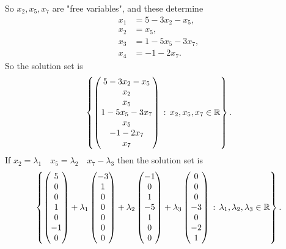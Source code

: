 \documentclass[10pt, a4paper]{article}
\begin{document}
\begin{example}
    So $x_2, x_5, x_7$ are "free variables",
    and these determine
    \begin{align*}
    x_1 &= 5 - 3x_2 - x_5, \\
    x_2 &= x_5, \\
    x_3 &= 1 - 5x_5 - 3x_7, \\
    x_4 &= -1 - 2x_7.
    \end{align*}
    So the solution set is
    \[
    \left\{
    \begin{pmatrix}
        5 - 3x_2 - x_5 \\
        x_2 \\
        x_5 \\
        1 - 5x_5 - 3x_7 \\
        x_5 \\
        -1 -2x_7 \\
        x_7
    \end{pmatrix}
    \,:\,
    x_2, x_5, x_7 \in \mathbb{R}
    \right\}.
    \]
    If $x_2 = \lambda_1\quad x_5 = \lambda_2\quad x_7 - \lambda_3$
    then the solution set is
    \[
    \left\{
    \begin{pmatrix}
        5 \\ 0 \\ 0 \\ 1 \\ 0 \\ -1 \\ 0
    \end{pmatrix}
    + \lambda_1
    \begin{pmatrix}
        -3 \\ 1 \\ 0 \\ 0 \\ 0 \\ 0 \\ 0
    \end{pmatrix}
    + \lambda_2
    \begin{pmatrix}
        -1 \\ 0 \\ 1 \\ -5 \\ 1 \\ 0 \\ 0
    \end{pmatrix}
    + \lambda_3
    \begin{pmatrix}
        0 \\ 0 \\ 0 \\ -3 \\ 0 \\ -2 \\ 1
    \end{pmatrix}
    \,:\,
    \lambda_1, \lambda_2, \lambda_3 \in \mathbb{R}
    \right\}.
    \]
\end{example}
\end{document}
